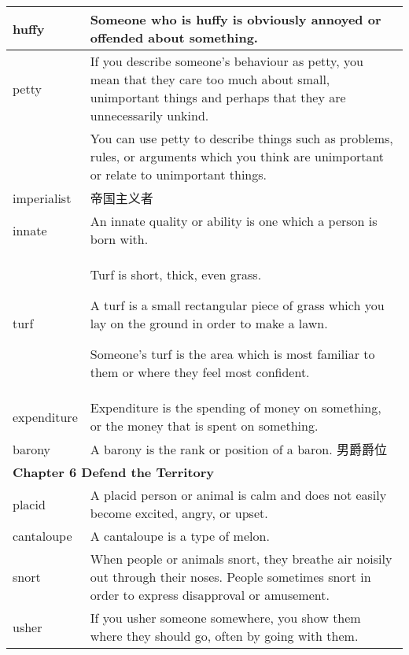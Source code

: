 \documentclass{article}
\begin{document}
\begin{center}
\begin{longtable}{|l|p{9cm}|}
\hline
huffy
&
Someone who is huffy is obviously annoyed or offended about something.
\\

\hline
petty
&
If you describe someone's behaviour as petty, you mean that they care too much about small, unimportant things and perhaps that they are unnecessarily unkind.
\\

&
You can use petty to describe things such as problems, rules, or arguments which you think are unimportant or relate to unimportant things.
\\

\hline
imperialist
&
帝国主义者
\\

\hline
innate
&
An innate quality or ability is one which a person is born with.
\\

\hline
turf
&
Turf is short, thick, even grass.
\par
A turf is a small rectangular piece of grass which you lay on the ground in order to make a lawn.
\par
Someone's turf is the area which is most familiar to them or where they feel most confident.
\\

\hline
expenditure
&
Expenditure is the spending of money on something, or the money that is spent on something.
\\

\hline
barony
&
A barony is the rank or position of a baron. 男爵爵位
\\

\hline
\multicolumn{2}{|l|}{\textbf{Chapter 6 Defend the Territory}}
\\

\hline
placid
&
A placid person or animal is calm and does not easily become excited, angry, or upset.
\\

\hline
cantaloupe
&
A cantaloupe is a type of melon.
\\

\hline
snort
&
When people or animals snort, they breathe air noisily out through their noses. People sometimes snort in order to express disapproval or amusement.
\\

\hline
usher
&
If you usher someone somewhere, you show them where they should go, often by going with them.
\\


\end{longtable}
\end{center}
\end{document}
